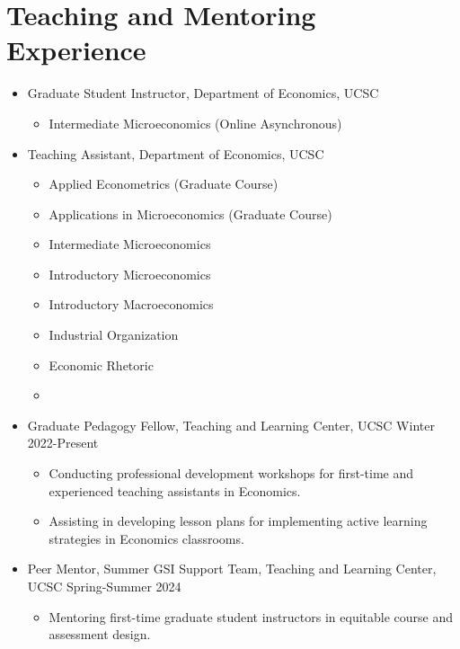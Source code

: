 \documentclass[letter,10pt]{article}
\newcommand{\dateright}[1]{\hfill{\small #1}}
\begin{document}
\section{Teaching and Mentoring Experience}
\begin{itemize}
    \item Graduate Student Instructor, Department of Economics, UCSC
        \begin{itemize}
            \item Intermediate Microeconomics (Online Asynchronous)  %
        \end{itemize}
    \item Teaching Assistant, Department of Economics, UCSC
    \begin{multicols}{2}
    \begin{small}
        \begin{itemize}
        \RaggedRight
            \item Applied Econometrics (Graduate Course) %
            \item Applications in Microeconomics (Graduate Course) %
            \item Intermediate Microeconomics %
            \item Introductory Microeconomics %
            \item Introductory Macroeconomics %
            \item Industrial Organization %
            \item Economic Rhetoric %
            \item[]
        \end{itemize}
        \end{small}
    \end{multicols}
        \item Graduate Pedagogy Fellow, Teaching and Learning Center, UCSC \dateright{Winter 2022-Present}
        \begin{itemize}
            \item Conducting professional development workshops for first-time and experienced teaching assistants in Economics.
            \item Assisting in developing lesson plans for implementing active learning strategies in Economics classrooms.
        \end{itemize}
        \item Peer Mentor, Summer GSI Support Team, Teaching and Learning Center, UCSC \dateright{Spring-Summer 2024}
        \begin{itemize}
            \item Mentoring first-time graduate student instructors in equitable course and assessment design.
        \end{itemize}
        
\end{itemize}
\end{document}
